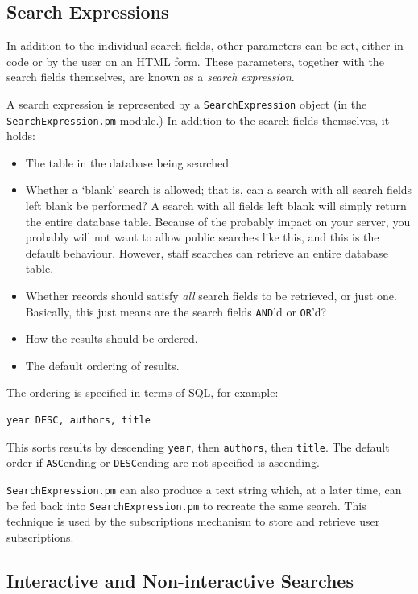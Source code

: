 \subsection{Search Expressions}

In addition to the individual search fields, other parameters can be set, either in code or by the user on an HTML form. These parameters, together with the search fields themselves, are known as a \emph{search expression}.

A search expression is represented by a {\tt SearchExpression} object (in the {\tt SearchExpression.pm} module.) In addition to the search fields themselves, it holds:

\begin{itemize}
\item The table in the database being searched
\item Whether a `blank' search is allowed; that is, can a search with all search fields left blank be performed? A search with all fields left blank will simply return the entire database table. Because of the probably impact on your server, you probably will not want to allow public searches like this, and this is the default behaviour. However, staff searches can retrieve an entire database table.
\item Whether records should satisfy \emph{all} search fields to be retrieved, or just one. Basically, this just means are the search fields {\tt AND}'d or {\tt OR}'d?
\item How the results should be ordered.
\item The default ordering of results.
\end{itemize}

The ordering is specified in terms of SQL, for example:

\begin{verbatim}
year DESC, authors, title
\end{verbatim}

This sorts results by descending {\tt year}, then {\tt authors}, then {\tt title}. The default order if {\tt ASC}ending or {\tt DESC}ending are not specified is ascending.

{\tt SearchExpression.pm} can also produce a text string which, at a later time, can be fed back into {\tt SearchExpression.pm} to recreate the same search. This technique is used by the subscriptions mechanism to store and retrieve user subscriptions.



\subsection{Interactive and Non-interactive Searches}

